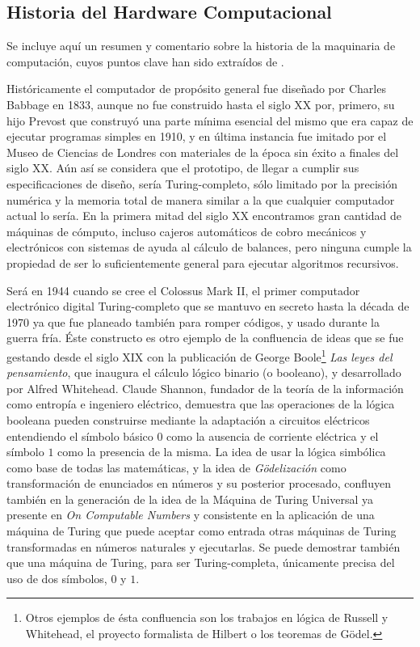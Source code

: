 \documentclass[12pt]{memoir}
\begin{document}
\begin{appendices}

\chapter{Historia del Hardware Computacional}
\label{compHis}

Se incluye aquí un resumen y comentario sobre la historia de la maquinaria de computación, cuyos puntos clave han sido extraídos de \parencite{wiki:computerhistory}.

Históricamente el computador de propósito general fue diseñado por Charles Babbage en 1833, aunque no fue construido hasta el siglo XX por, primero, su hijo Prevost que construyó una parte mínima esencial del mismo que era capaz de ejecutar programas simples en 1910, y en última instancia fue imitado por el Museo de Ciencias de Londres con materiales de la época sin éxito a finales del siglo XX. Aún así se considera que el prototipo, de llegar a cumplir sus especificaciones de diseño, sería Turing-completo, sólo limitado por la precisión numérica y la memoria total de manera similar a la que cualquier computador actual lo sería. En la primera mitad del siglo XX encontramos gran cantidad de máquinas de cómputo, incluso cajeros automáticos de cobro mecánicos y electrónicos con sistemas de ayuda al cálculo de balances, pero ninguna cumple la propiedad de ser lo suficientemente general para ejecutar algoritmos recursivos.

Será en 1944 cuando se cree el Colossus Mark II, el primer computador electrónico digital Turing-completo que se mantuvo en secreto hasta la década de 1970 ya que fue planeado también para romper códigos, y usado durante la guerra fría. Éste constructo es otro ejemplo de la confluencia de ideas que se fue gestando desde el siglo XIX con la publicación de George Boole\footnote{Otros ejemplos de ésta confluencia son los trabajos en lógica de Russell y Whitehead, el proyecto formalista de Hilbert o los teoremas de Gödel.} \textit{Las leyes del pensamiento}, que inaugura el cálculo lógico binario (o booleano), y desarrollado por Alfred Whitehead. Claude Shannon, fundador de la teoría de la información como entropía e ingeniero eléctrico, demuestra que las operaciones de la lógica booleana pueden construirse mediante la adaptación a circuitos eléctricos entendiendo el símbolo básico $0$ como la ausencia de corriente eléctrica y el símbolo $1$ como la presencia de la misma. La idea de usar la lógica simbólica como base de todas las matemáticas, y la idea de \textit{Gödelización} como transformación de enunciados en números y su posterior procesado, confluyen también en la generación de la idea de la Máquina de Turing Universal ya presente en \textit{On Computable Numbers} y consistente en la aplicación de una máquina de Turing que puede aceptar como entrada otras máquinas de Turing transformadas en números naturales y ejecutarlas. Se puede demostrar también que una máquina de Turing, para ser Turing-completa, únicamente precisa del uso de dos símbolos, $0$ y $1$. 


\end{appendices}
\end{document}

